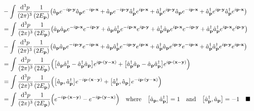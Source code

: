 \documentclass{article}
\begin{document}
\begin{align*}
                                       & -\int\frac{\dd[3]{p}}{(2\pi)^3}\frac{1}{(2E_{\vb{p}})}\pqty{\hat{a}_{\vb{p}}e^{-i\vb{p}\vdot\vb{y}}\hat{a}_{\vb{p}}e^{-i\vb{p}\vdot\vb{x}}+\hat{a}_{\vb{p}}e^{-i\vb{p}\vdot\vb{y}}\hat{a}^\dagger_{\vb{p}}e^{i\vb{p}\vdot\vb{x}}+\hat{a}^\dagger_{\vb{p}}e^{i\vb{p}\vdot\vb{y}}\hat{a}_{\vb{p}}e^{-i\vb{p}\vdot\vb{x}}+\hat{a}^\dagger_{\vb{p}}e^{i\vb{p}\vdot\vb{y}}\hat{a}^\dagger_{\vb{p}}e^{i\vb{p}\vdot\vb{x}}} \\
                                       & =\int\frac{\dd[3]{p}}{(2\pi)^3}\frac{1}{(2E_{\vb{p}})}\pqty{\hat{a}_{\vb{p}}\hat{a}_{\vb{p}}e^{-i\vb{p}\vdot\vb{x}}e^{-i\vb{p}\vdot\vb{y}}+\hat{a}_{\vb{p}}\hat{a}^\dagger_{\vb{p}}e^{-i\vb{p}\vdot\vb{x}}e^{i\vb{p}\vdot\vb{y}}+\hat{a}^\dagger_{\vb{p}}\hat{a}_{\vb{p}}e^{i\vb{p}\vdot\vb{x}}e^{-i\vb{p}\vdot\vb{y}}+\hat{a}^\dagger_{\vb{p}}\hat{a}^\dagger_{\vb{p}}e^{i\vb{p}\vdot\vb{x}}e^{i\vb{p}\vdot\vb{y}}} \\
                                       & -\int\frac{\dd[3]{p}}{(2\pi)^3}\frac{1}{(2E_{\vb{p}})}\pqty{\hat{a}_{\vb{p}}\hat{a}_{\vb{p}}e^{-i\vb{p}\vdot\vb{y}}e^{-i\vb{p}\vdot\vb{x}}+\hat{a}_{\vb{p}}\hat{a}^\dagger_{\vb{p}}e^{-i\vb{p}\vdot\vb{y}}e^{i\vb{p}\vdot\vb{x}}+\hat{a}^\dagger_{\vb{p}}\hat{a}_{\vb{p}}e^{i\vb{p}\vdot\vb{y}}e^{-i\vb{p}\vdot\vb{x}}+\hat{a}^\dagger_{\vb{p}}\hat{a}^\dagger_{\vb{p}}e^{i\vb{p}\vdot\vb{y}}e^{i\vb{p}\vdot\vb{x}}} \\
                                       & =\int\frac{\dd[3]{p}}{(2\pi)^3}\frac{1}{(2E_{\vb{p}})}\pqty{\bqty{\hat{a}_{\vb{p}}\hat{a}^\dagger_{\vb{p}}-\hat{a}^\dagger_{\vb{p}}\hat{a}_{\vb{p}}}e^{i\vb{p}\vdot\pqty{\vb{y}-\vb{x}}}+\bqty{\hat{a}^\dagger_{\vb{p}}\hat{a}_{\vb{p}}-\hat{a}_{\vb{p}}\hat{a}^\dagger_{\vb{p}}}e^{i\vb{p}\vdot\pqty{\vb{x}-\vb{y}}}}                                                                                               \\
                                       & =\int\frac{\dd[3]{p}}{(2\pi)^3}\frac{1}{(2E_{\vb{p}})}\pqty{\bqty{\hat{a}_{\vb{p}},\hat{a}^\dagger_{\vb{p}}}e^{-i\vb{p}\vdot\pqty{\vb{x}-\vb{y}}}+\bqty{\hat{a}^\dagger_{\vb{p}},\hat{a}_{\vb{p}}          }e^{-i\vb{p}\vdot\pqty{\vb{y}-\vb{x}}}}                                                                                                                                                                   \\
                                       & =\int\frac{\dd[3]{p}}{(2\pi)^3}\frac{1}{(2E_{\vb{p}})}\pqty{e^{-i\vb{p}\vdot\pqty{\vb{x}-\vb{y}}}-e^{-i\vb{p}\vdot\pqty{\vb{y}-\vb{x}}}}\qq{where}\bqty{\hat{a}_{\vb{p}},\hat{a}^\dagger_{\vb{p}}}=1\qand \bqty{\hat{a}^\dagger_{\vb{p}},\hat{a}_{\vb{p}}          }=-1 \quad\blacksquare                                                                                                                            \\
\end{align*}
\end{document}
